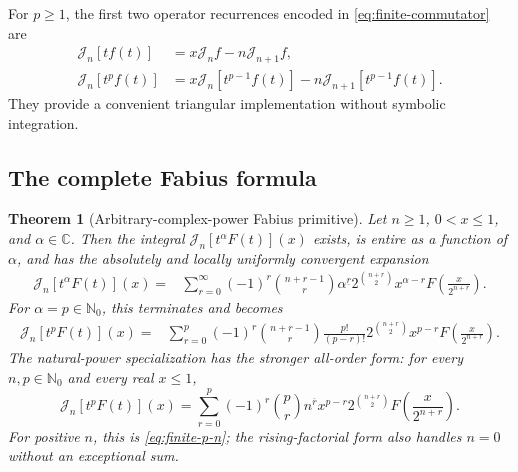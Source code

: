 \documentclass[11pt,oneside]{article}
\newtheorem{theorem}{Theorem}[section]
\theoremstyle{definition}
\theoremstyle{remark}
\newcommand{\C}{\mathbb C}
\newcommand{\N}{\mathbb N}
\newcommand{\fall}[2]{#1^{\underline{#2}}}
\newcommand{\rise}[2]{#1^{\overline{#2}}}
\newcommand{\Jn}{\mathcal J}
\newcommand{\1}{\mathbf 1}
\begin{document}
For \(p\geq1\), the first two operator recurrences encoded in
\eqref{eq:finite-commutator} are
\begin{align}
 \Jn_n[t f(t)]&=x\Jn_nf-n\Jn_{n+1}f,                            \label{eq:xf-rec}\\
 \Jn_n[t^pf(t)]&=x\Jn_n[t^{p-1}f(t)]-n\Jn_{n+1}[t^{p-1}f(t)].   \label{eq:triangular-rec}
\end{align}
They provide a convenient triangular implementation without symbolic
integration.

\subsection{The complete Fabius formula}

\begin{theorem}[Arbitrary-complex-power Fabius primitive]\label{thm:newton-volterra}
Let \(n\geq1\), \(0<x\leq1\), and \(\alpha\in\C\).  Then the integral
\(\Jn_n[t^\alpha F(t)](x)\) exists, is entire as a function of \(\alpha\), and
has the absolutely and locally uniformly convergent expansion
\begin{equation}
 \boxed{\begin{aligned}
 \Jn_n[t^\alpha F(t)](x)
 ={}&\sum_{r=0}^{\infty}(-1)^r\binom{n+r-1}{r}\fall{\alpha}{r}
 2^{\binom{n+r}{2}}x^{\alpha-r}
 F\!\left(\frac{x}{2^{n+r}}\right).
 \end{aligned}}                                                \label{eq:master-alpha-n}
\end{equation}
For \(\alpha=p\in\N_0\), this terminates and becomes
\begin{equation}
 \boxed{\begin{aligned}
 \Jn_n[t^pF(t)](x)
 ={}&\sum_{r=0}^{p}(-1)^r\binom{n+r-1}{r}\frac{p!}{(p-r)!}
 2^{\binom{n+r}{2}}x^{p-r}
 F\!\left(\frac{x}{2^{n+r}}\right).
 \end{aligned}}                                                \label{eq:finite-p-n}
\end{equation}
The natural-power specialization has the stronger all-order form: for every
\(n,p\in\N_0\) and every real \(x\leq1\),
\begin{equation}
 \boxed{\quad
 \Jn_n[t^pF(t)](x)
 =\sum_{r=0}^{p}(-1)^r\binom pr\rise nr x^{p-r}
 2^{\binom{n+r}{2}}F\!\left(\frac{x}{2^{n+r}}\right).
 \quad}                                                       \label{eq:finite-p-n-all-order}
\end{equation}
For positive \(n\), this is \eqref{eq:finite-p-n}; the rising-factorial form
also handles \(n=0\) without an exceptional sum.
\end{theorem}
\end{document}
